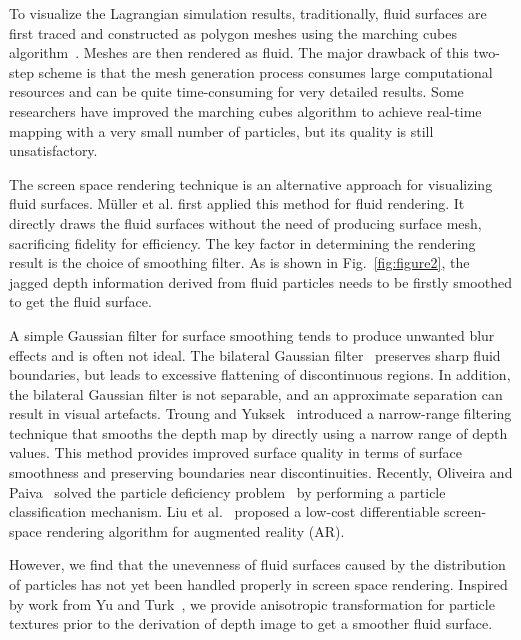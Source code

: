\documentclass[times,twocolumn,final]{elsarticle}
\begin{document}
To visualize the Lagrangian simulation results, traditionally, fluid surfaces are first traced and constructed as polygon meshes using the marching cubes algorithm~\cite{ref:ref12,ref:ref6,yang2020completely}. Meshes are then rendered as fluid. The major drawback of this two-step scheme is that the mesh generation process consumes large computational resources and can be quite time-consuming for very detailed results. Some researchers have improved the marching cubes algorithm to achieve real-time mapping with a very small number of particles, but its quality is still unsatisfactory\cite{ref:ref10}.

The screen space rendering technique is an alternative approach for visualizing fluid surfaces. M{\"u}ller et al.\cite{ref:ref2} first applied this method for fluid rendering. It directly draws the fluid surfaces without the need of producing surface mesh, sacrificing fidelity for efficiency. The key factor in determining the rendering result is the choice of smoothing filter. As is shown in Fig.~\ref{fig:figure2}, the jagged depth information derived from fluid particles needs to be firstly smoothed to get the fluid surface. 

A simple Gaussian filter for surface smoothing\cite{ref:ref2} tends to produce unwanted blur effects and is often not ideal. The bilateral Gaussian filter~\cite{ref:ref15,neto2017real} preserves sharp fluid boundaries, but leads to excessive flattening of discontinuous regions. In addition, the bilateral Gaussian filter is not separable, and an approximate separation can result in visual artefacts. Troung and Yuksek~\cite{truong2018narrow} introduced a narrow-range filtering technique that smooths the depth map by directly using a narrow range of depth values. This method provides improved surface quality in terms of surface smoothness and preserving boundaries near discontinuities.
Recently, Oliveira and Paiva~\cite{oliveira2022narrow} solved the particle deficiency problem~\cite{truong2018narrow} by performing a particle classification mechanism. Liu et al.~\cite{liu2022real} proposed a low-cost differentiable screen-space rendering algorithm for augmented reality (AR).

However, we find that the unevenness of fluid surfaces caused by the distribution of particles has not yet been handled properly in screen space rendering. Inspired by work from Yu and Turk~\cite{yu2013reconstructing}, we provide anisotropic transformation for particle textures prior to the derivation of depth image to get a smoother fluid surface.
\end{document}
